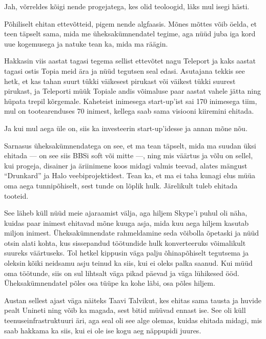 
Jah, võrreldes kõigi nende progejatega, kes olid teoloogid, läks mul isegi 
hästi.


Põhiliselt ehitan ettevõtteid, pigem nende algfaasis. 
Mõnes mõttes võib öelda, et teen täpselt sama, mida me üheksakümnendatel 
tegime, aga nüüd juba iga kord uue kogemusega ja
natuke tean ka, mida ma räägin. 

Hakkasin viis 
aastat tagasi tegema sellist ettevõtet nagu Teleport ja kaks aastat tagasi ostis Topia
meid ära ja nüüd tegutsen seal edasi. Asutajana tekkis see hetk, et kas tahan suurt tükki 
väikesest pirukast või väikest tükki suurest pirukast, ja Teleporti müük 
Topiale andis võimaluse paar aastat vahele jätta ning hüpata trepil 
kõrgemale. Kaheteist inimesega start-up'ist sai 170 inimesega tiim, mul on tootearenduses 70 
inimest, kellega saab sama visiooni kiiremini ehitada. 

Ja kui mul aega üle on, siis ka investeerin start-up'idesse ja annan mõne
nõu. 

Sarnasus üheksakümnendatega on see, et ma tean täpselt, mida ma suudan üksi 
ehitada --- on see siis BBSi soft või mitte ---, ning mis väärtus ja võlu 
on sellel, kui progeja, disainer ja äriinimene koos midagi valmis teevad, alates mängust \enquote{Drunkard} ja 
Halo veebiprojektidest. Tean ka, et ma ei taha kunagi elus müüa oma aega 
tunnipõhiselt, sest tunde on lõplik hulk. Järelikult tuleb ehitada tooteid. 

See läheb küll nüüd meie ajaraamist välja, aga hiljem 
Skype'i puhul oli näha, kuidas paar inimest ehitavad mõne kuuga asja, 
mida kuu aega hiljem kasutab miljon inimest. Üheksakümnendate 
rahmeldamine seda võibolla õpetaski ja nüüd otsin alati kohta, kus 
sissepandud töötundide hulk konverteeruks võimalikult suureks väärtuseks. Tol 
hetkel kippusin väga palju õhinapõhiselt tegutsema ja 
oleksin kõiki neidsamu asju teinud ka siis, kui ei oleks palka saanud. Kui 
müüd oma töötunde, siis on sul lihtsalt väga pikad päevad ja väga lühikesed 
ööd. Üheksakümnendatel põles osa tüüpe ka kohe läbi, osa põles hiljem. 

Austan sellest ajast väga näiteks
Taavi Talvikut, kes ehitas sama tausta ja huvide 
pealt Unineti ning võib ka magada, sest bitid müüvad 
ennast ise. See oli küll teenuseinfrastruktuuri äri, aga seal oli see alge 
olemas, kuidas ehitada midagi, mis saab hakkama ka siis, kui ei ole ise kogu 
aeg näppupidi juures.